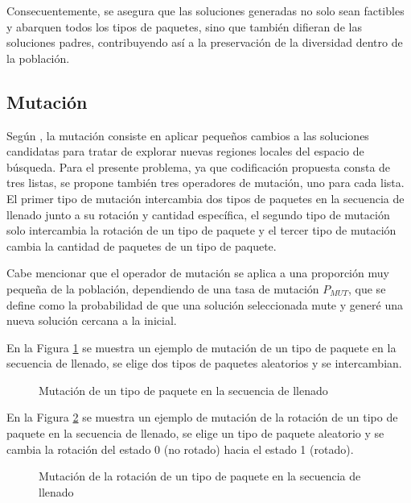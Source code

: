\documentclass[openany]{article}
\begin{document}
Consecuentemente, se asegura que las soluciones generadas no solo sean factibles y abarquen todos los tipos de paquetes, sino que también difieran de las soluciones padres, contribuyendo así a la preservación de la diversidad dentro de la población.

\subsection{Mutación}

Según \textcite{Dockhorn2022}, la mutación consiste en aplicar pequeños cambios a las soluciones candidatas para tratar de explorar nuevas regiones locales del espacio de búsqueda. Para el presente problema, ya que codificación propuesta consta de tres listas, se propone también tres operadores de mutación, uno para cada lista. El primer tipo de mutación intercambia dos tipos de paquetes en la secuencia de llenado junto a su rotación y cantidad específica, el segundo tipo de mutación solo intercambia la rotación de un tipo de paquete y el tercer tipo de mutación cambia la cantidad de paquetes de un tipo de paquete.

Cabe mencionar que el operador de mutación se aplica a una proporción muy pequeña de la población, dependiendo de una tasa de mutación $P_{MUT}$, que se define como la probabilidad de que una solución seleccionada mute y generé una nueva solución cercana a la inicial.

En la Figura \ref{fig:mutacion_tipo} se muestra un ejemplo de mutación de un tipo de paquete en la secuencia de llenado, se elige dos tipos de paquetes aleatorios y se intercambian.

\begin{figure}[H]
    \centering
    
    \caption{Mutación de un tipo de paquete en la secuencia de llenado}
    \label{fig:mutacion_tipo}
\end{figure}

En la Figura \ref{fig:mutacion_rotacion} se muestra un ejemplo de mutación de la rotación de un tipo de paquete en la secuencia de llenado, se elige un tipo de paquete aleatorio y se cambia la rotación del estado 0 (no rotado) hacia el estado 1 (rotado).

\begin{figure}[H]
    \centering
    
    \caption{Mutación de la rotación de un tipo de paquete en la secuencia de llenado}
    \label{fig:mutacion_rotacion}
\end{figure}
\end{document}
